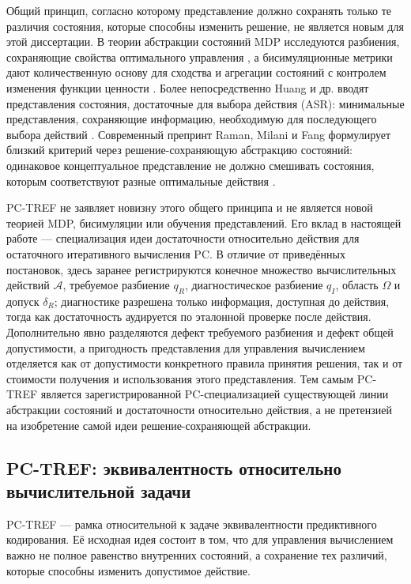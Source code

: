 Общий принцип, согласно которому представление должно сохранять только те
различия состояния, которые способны изменить решение, не является новым для
этой диссертации. В теории абстракции состояний MDP исследуются разбиения,
сохраняющие свойства оптимального управления \cite{li2006stateabstraction}, а
бисимуляционные метрики дают количественную основу для сходства и агрегации
состояний с контролем изменения функции ценности \cite{ferns2004metrics}.
Более непосредственно Huang и др. вводят представления состояния,
достаточные для выбора действия (ASR): минимальные представления, сохраняющие
информацию, необходимую для последующего выбора действий
\cite{huang2022actionsufficient}.
Современный препринт Raman, Milani и Fang формулирует близкий критерий через
решение-сохраняющую абстракцию состояний: одинаковое концептуальное
представление не должно смешивать состояния, которым соответствуют разные
оптимальные действия \cite{raman2026decisionrelevant}.

PC-TREF не заявляет новизну этого общего принципа и не является новой теорией
MDP, бисимуляции или обучения представлений. Его вклад в настоящей работе ---
специализация идеи достаточности относительно действия для остаточного
итеративного вычисления PC. В отличие от приведённых постановок, здесь заранее
регистрируются конечное множество вычислительных действий $\mathcal A$,
требуемое разбиение $q_R$, диагностическое разбиение $q_I$, область $\Omega$ и
допуск $\delta_R$; диагностике разрешена только информация, доступная до
действия, тогда как достаточность аудируется по эталонной проверке после
действия. Дополнительно явно разделяются дефект требуемого разбиения и дефект
общей допустимости, а пригодность представления для управления
вычислением отделяется как от допустимости конкретного правила принятия решения, так и от
стоимости получения и использования этого представления. Тем самым PC-TREF
является зарегистрированной PC-специализацией существующей линии абстракции
состояний и достаточности относительно действия, а не претензией на изобретение
самой идеи решение-сохраняющей абстракции.

\subsection{PC-TREF: эквивалентность относительно вычислительной задачи}
\label{sec:theory-pc-tref}

PC-TREF --- рамка относительной к задаче эквивалентности предиктивного
кодирования. Её исходная идея состоит в том, что для управления вычислением
важно не полное равенство внутренних состояний, а сохранение тех различий,
которые способны изменить допустимое действие.

